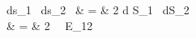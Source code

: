 ds_1 \, ds_2 \, \cos \theta & = & 2 d S_1 \, dS_2 \,  \cdot {}  \\
\cos \theta & = & 2  \,  \, E_{12}
